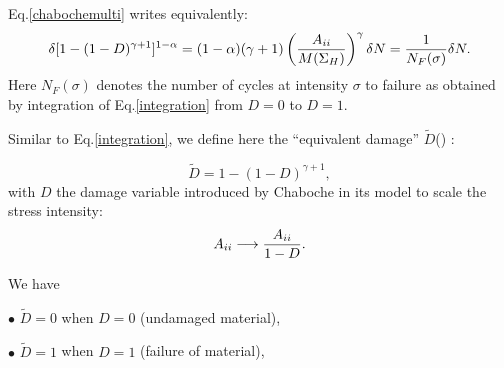 Eq.\eqref{chabochemulti} writes equivalently:
\begin{equation}\delta [1-(1-D)^{\gamma+1}]^{1-\alpha}=(1-\alpha)(\gamma+1)\left(\dfrac{{A}_{\uppercase\expandafter{\romannumeral2}} }{M(\Sigma_H)}\right)^\gamma \delta N=\dfrac{1}{N_F(\sigma)}\delta N.
\label{integration}
\end{equation}
Here $N_F(\sigma)$ denotes the number of cycles at intensity $\sigma$ to failure as obtained by integration of Eq.\eqref{integration} from $D=0$ to $D=1$. 

%
%

Similar to Eq.\eqref{integration}, we define here the ``equivalent damage'' $\tilde{D}$() :

\begin{equation}
\tilde{D}=1-(1-D)^{\gamma+1},
\label{eq.Dhat}
\end{equation}
with $D$ the damage variable introduced by Chaboche in its model to scale the stress intensity:
$${A}_{\uppercase\expandafter{\romannumeral2}} \longrightarrow \dfrac{{A}_{\uppercase\expandafter{\romannumeral2}}}{1-D}.$$

We have 

$\bullet$ $\tilde{D}=0$ when $D=0$ (undamaged material),

$\bullet$ $\tilde{D}=1$ when $D=1$ (failure of material),	

